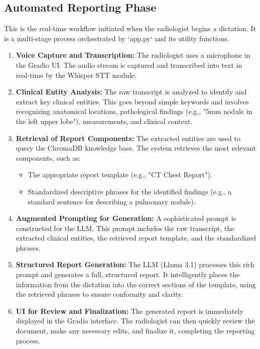 \subsection{Automated Reporting Phase}
This is the real-time workflow initiated when the radiologist begins a dictation. It is a multi-stage process orchestrated by `app.py` and its utility functions.
\begin{enumerate}
    \item \textbf{Voice Capture and Transcription:} The radiologist uses a microphone in the Gradio UI. The audio stream is captured and transcribed into text in real-time by the Whisper STT module.
    \item \textbf{Clinical Entity Analysis:} The raw transcript is analyzed to identify and extract key clinical entities. This goes beyond simple keywords and involves recognizing anatomical locations, pathological findings (e.g., "5mm nodule in the left upper lobe"), measurements, and clinical context.
    \item \textbf{Retrieval of Report Components:} The extracted entities are used to query the ChromaDB knowledge base. The system retrieves the most relevant components, such as:
        \begin{itemize}
            \item The appropriate report template (e.g., "CT Chest Report").
            \item Standardized descriptive phrases for the identified findings (e.g., a standard sentence for describing a pulmonary nodule).
        \end{itemize}
    \item \textbf{Augmented Prompting for Generation:} A sophisticated prompt is constructed for the LLM. This prompt includes the raw transcript, the extracted clinical entities, the retrieved report template, and the standardized phrases.
    \item \textbf{Structured Report Generation:} The LLM (Llama 3.1) processes this rich prompt and generates a full, structured report. It intelligently places the information from the dictation into the correct sections of the template, using the retrieved phrases to ensure conformity and clarity.
    \item \textbf{UI for Review and Finalization:} The generated report is immediately displayed in the Gradio interface. The radiologist can then quickly review the document, make any necessary edits, and finalize it, completing the reporting process.
\end{enumerate}

